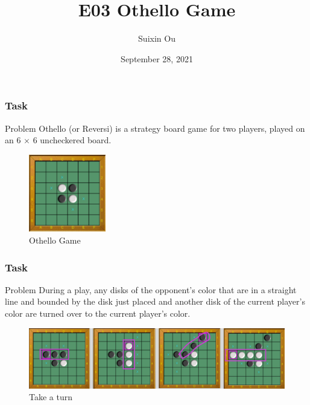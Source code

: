\documentclass{beamer}
\title{E03 Othello Game}
\author{Suixin Ou} %
\institute[SYSU] %
{
  School of Computer Science\\
  Sun Yat-sen University \\ %
  \medskip
}
\date{September 28, 2021} %
\begin{document}
\begin{frame}
  \titlepage
\end{frame}

\begin{frame}
  \frametitle{Task}
  \begin{block}{Problem}
    Othello (or Reversi) is a strategy board game for two players, played on an 6 $\times$ 6 uncheckered board.

    \begin{figure}[ht]
      \centering
      \includegraphics[width=0.3\textwidth]{Pic/2thello}
      \caption{Othello Game}
    \end{figure}
  \end{block}
\end{frame}

\begin{frame}
  \frametitle{Task}
  \begin{block}{Problem}
During a play, any disks of the opponent's color that are in a straight line and bounded by the disk just placed and another disk of the current player's color are turned over to the current player's color.

    \begin{figure}[ht]
      \centering
      \includegraphics[width=1.0\textwidth]{Pic/2thello1}
      \caption{Take a turn}
    \end{figure}
  \end{block}
\end{frame}
\end{document}

